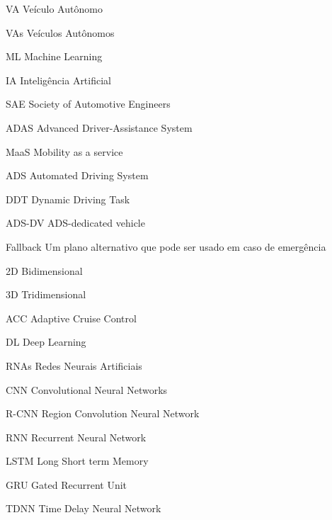 \documentclass[
	12pt,				%
	openany, %
	a4paper,			%
	english,			%
	french,				%
	spanish,			%
	brazil				%
	]{abntex2}
\let\cleardoublepage\clearpage %
\begin{document}
\begin{siglas} \label{eq:1}
	\item[VA] Veículo Autônomo 
	\item[VAs] Veículos Autônomos
	\item[ML] Machine Learning
	\item[IA] Inteligência Artificial
	\item[SAE] Society of Automotive Engineers
	\item[ADAS] Advanced Driver-Assistance System
	\item[MaaS] Mobility as a service
	\item[ADS] Automated Driving System
	\item[DDT] Dynamic Driving Task
	\item[ADS-DV] ADS-dedicated vehicle
	\item[Fallback] Um plano alternativo que pode ser usado em caso de emergência
	\item[2D] Bidimensional
	\item[3D] Tridimensional
	\item[ACC] Adaptive Cruise Control
	\item[DL] Deep Learning
	\item[RNAs] Redes Neurais Artificiais
	\item[CNN] Convolutional Neural Networks
	\item[R-CNN] Region Convolution Neural Network
	\item[RNN] Recurrent Neural Network
	\item[LSTM] Long Short term Memory
	\item[GRU] Gated Recurrent Unit 
	\item[TDNN] Time Delay Neural Network
\end{siglas}




\tableofcontents*
\cleardoublepage



\textual

\end{document}
